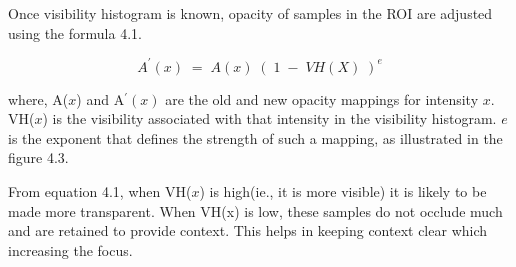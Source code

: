 Once visibility histogram is known, opacity of samples in the ROI are adjusted using the formula 4.1.

\begin{equation} 
A^{'}(x) \; = \; A(x) \; ( \; 1 \; - \; VH(X) \; )^{e} 
\end{equation}

where, A($x$) and A$^{'}(x)$ are the old and new opacity mappings for intensity $x$. VH($x$) is the visibility associated with that intensity in the visibility histogram. $e$ is the exponent that defines the strength of such a mapping, as illustrated in the figure 4.3.

From equation 4.1, when VH($x$) is high(ie., it is more visible) it is likely to be made more transparent. When VH(x) is low, these samples do not occlude much and are retained to provide context. This helps in keeping context clear which increasing the focus. 


